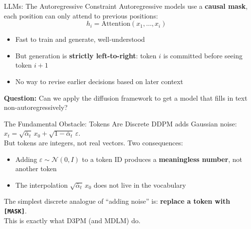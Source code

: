 \documentclass[10pt, aspectratio=169]{beamer}
\newcommand{\MASK}{\texttt{[MASK]}}
\begin{document}
\begin{frame}{LLMs: The Autoregressive Constraint}
  Autoregressive models use a \textbf{causal mask}, each position can only attend to previous positions:
  \[
    h_i = \mathrm{Attention}(x_1, \ldots, x_i)
  \]
  \begin{itemize}
    \item Fast to train and generate, well-understood
    \item But generation is \textbf{strictly left-to-right}: token $i$ is committed before seeing token $i+1$
    \item No way to revise earlier decisions based on later context
  \end{itemize}
  \vspace{8pt}
  \textbf{Question:} Can we apply the diffusion framework to get a model that fills in text non-autoregressively?
\end{frame}

\begin{frame}{The Fundamental Obstacle: Tokens Are Discrete}
  DDPM adds Gaussian noise: $x_t = \sqrt{\bar\alpha_t}\,x_0 + \sqrt{1-\bar\alpha_t}\,\varepsilon$.\\[8pt]
  But tokens are integers, not real vectors. Two consequences:
  \begin{itemize}
    \item Adding $\varepsilon \sim \mathcal{N}(0,I)$ to a token ID produces a \textbf{meaningless number}, not another token
    \item The interpolation $\sqrt{\bar\alpha_t}\,x_0$ does not live in the vocabulary
  \end{itemize}
  \vspace{8pt}
  The simplest discrete analogue of ``adding noise'' is: \textbf{replace a token with \MASK}.\\[6pt]
  This is exactly what D3PM (and MDLM) do.
\end{frame}
\end{document}
